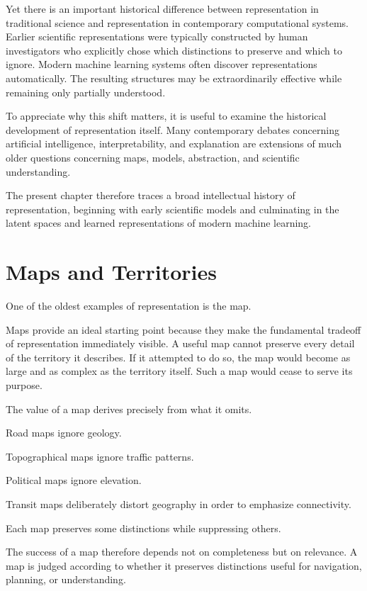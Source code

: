 \documentclass[11pt,oneside,openany]{book}
\begin{document}
Yet there is an important historical difference between representation in traditional science and representation in contemporary computational systems. Earlier scientific representations were typically constructed by human investigators who explicitly chose which distinctions to preserve and which to ignore. Modern machine learning systems often discover representations automatically. The resulting structures may be extraordinarily effective while remaining only partially understood.

To appreciate why this shift matters, it is useful to examine the historical development of representation itself. Many contemporary debates concerning artificial intelligence, interpretability, and explanation are extensions of much older questions concerning maps, models, abstraction, and scientific understanding.

The present chapter therefore traces a broad intellectual history of representation, beginning with early scientific models and culminating in the latent spaces and learned representations of modern machine learning.

\section{Maps and Territories}

One of the oldest examples of representation is the map.

Maps provide an ideal starting point because they make the fundamental tradeoff of representation immediately visible. A useful map cannot preserve every detail of the territory it describes. If it attempted to do so, the map would become as large and as complex as the territory itself. Such a map would cease to serve its purpose.

The value of a map derives precisely from what it omits.

Road maps ignore geology.

Topographical maps ignore traffic patterns.

Political maps ignore elevation.

Transit maps deliberately distort geography in order to emphasize connectivity.

Each map preserves some distinctions while suppressing others.

The success of a map therefore depends not on completeness but on relevance. A map is judged according to whether it preserves distinctions useful for navigation, planning, or understanding.
\end{document}
